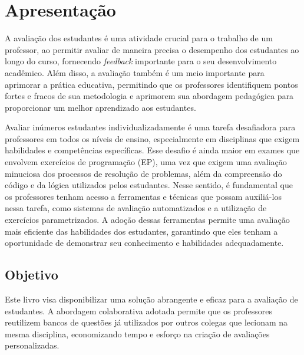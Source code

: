 
\label{ch:introducao}

\section{Apresentação}


A avaliação dos estudantes é uma atividade crucial para o trabalho de um professor, ao permitir avaliar de maneira precisa o desempenho dos estudantes ao longo do curso, fornecendo \textit{feedback} importante para o seu desenvolvimento acadêmico. Além disso, a avaliação também é um meio importante para aprimorar a prática educativa, permitindo que os professores identifiquem pontos fortes e fracos de sua metodologia e aprimorem sua abordagem pedagógica para proporcionar um melhor aprendizado aos estudantes.


Avaliar inúmeros estudantes individualizadamente é uma tarefa desafiadora para professores em todos os níveis de ensino, especialmente em disciplinas que exigem habilidades e competências específicas. Esse desafio é ainda maior em exames que envolvem exercícios de programação (EP), uma vez que exigem uma avaliação minuciosa dos processos de resolução de problemas, além da compreensão do código e da lógica utilizados pelos estudantes. Nesse sentido, é fundamental que os professores tenham acesso a ferramentas e técnicas que possam auxiliá-los nessa tarefa, como sistemas de avaliação automatizados e a utilização de exercícios parametrizados. A adoção dessas ferramentas permite uma avaliação mais eficiente das habilidades dos estudantes, garantindo que eles tenham a oportunidade de demonstrar seu conhecimento e habilidades adequadamente.

\subsection{Objetivo} 
Este livro visa disponibilizar uma solução abrangente e eficaz para a avaliação de estudantes. A abordagem colaborativa adotada permite que os professores reutilizem bancos de questões já utilizados por outros colegas que lecionam na mesma disciplina, economizando tempo e esforço na criação de avaliações personalizadas.

